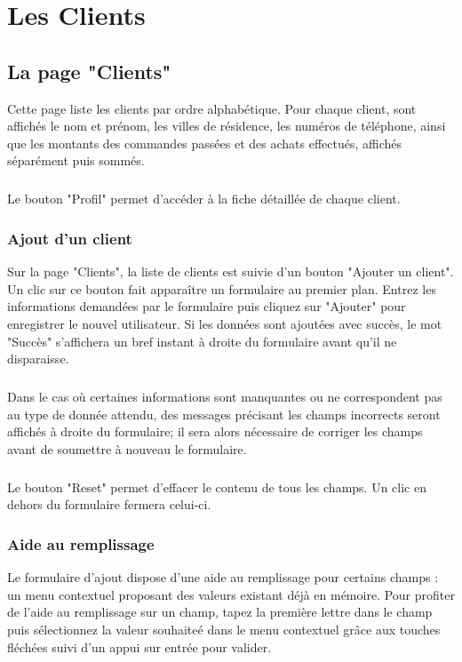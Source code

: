 \chapter{Les Clients}

\section{La page "Clients"}
Cette page liste les clients par ordre alphabétique. Pour chaque client, sont
affichés le nom et prénom, les villes de résidence, les numéros de téléphone, 
ainsi que les montants des commandes passées et des achats effectués, affichés
séparément puis sommés.

\paragraph{}
Le bouton "Profil" permet d'accéder à la fiche détaillée de chaque client.

\subsection{Ajout d'un client}
Sur la page "Clients", la liste de clients est suivie d'un bouton
"Ajouter un client". Un clic sur ce bouton fait apparaître un formulaire au
premier plan. Entrez les informations demandées par le formulaire puis cliquez
sur "Ajouter" pour enregistrer le nouvel utilisateur. Si les données sont
ajoutées avec succès, le mot "Succès" s'affichera un bref instant à droite du
formulaire avant qu'il ne disparaisse.

\paragraph{}
Dans le cas où certaines informations
sont manquantes ou ne correspondent pas au type de donnée attendu, des messages
précisant les champs incorrects seront affichés à droite du formulaire; il sera
alors nécessaire de corriger les champs avant de soumettre à nouveau le
formulaire.

\paragraph{}
Le bouton "Reset" permet d'effacer le contenu de tous les champs. Un clic en
dehors du formulaire fermera celui-ci.

\subsection{Aide au remplissage}
Le formulaire d'ajout dispose d'une aide au remplissage pour certains champs :
un menu contextuel proposant des valeurs existant déjà en mémoire. Pour profiter
de l'aide au remplissage sur un champ, tapez la première lettre dans le champ
puis sélectionnez la valeur souhaiteé dans le menu contextuel grâce aux touches
fléchées suivi d'un appui sur entrée pour valider.


